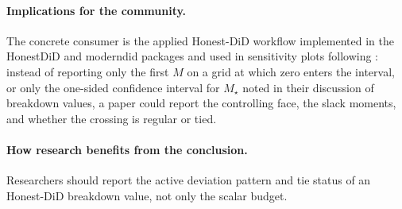 \documentclass[11pt]{article}
\theoremstyle{definition}
\theoremstyle{plain}
\theoremstyle{remark}
\begin{document}
\paragraph{Implications for the community.}
The concrete consumer is the applied Honest-DiD workflow implemented in the
HonestDiD and moderndid packages and used in sensitivity plots following
\citet{RambachanRoth2023}: instead of reporting only the first \(M\) on a
grid at which zero enters the interval, or only the one-sided confidence
interval for \(M_\star\) noted in their discussion of breakdown values, a
paper could report the controlling face, the slack moments, and whether the
crossing is regular or tied.

\paragraph{How research benefits from the conclusion.}
Researchers should report the active deviation pattern and tie status of an
Honest-DiD breakdown value, not only the scalar budget.
\end{document}
